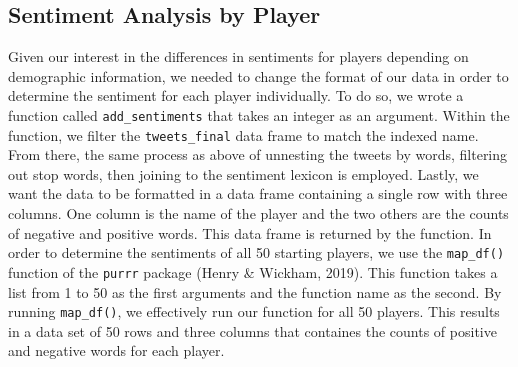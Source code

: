 \documentclass[12pt,twoside]{reedthesis}
\begin{document}
\subsection{Sentiment Analysis by
Player}\label{sentiment-analysis-by-player}

Given our interest in the differences in sentiments for players
depending on demographic information, we needed to change the format of
our data in order to determine the sentiment for each player
individually. To do so, we wrote a function called
\texttt{add\_sentiments} that takes an integer as an argument. Within
the function, we filter the \texttt{tweets\_final} data frame to match
the indexed name. From there, the same process as above of unnesting the
tweets by words, filtering out stop words, then joining to the sentiment
lexicon is employed. Lastly, we want the data to be formatted in a data
frame containing a single row with three columns. One column is the name
of the player and the two others are the counts of negative and positive
words. This data frame is returned by the function. In order to
determine the sentiments of all 50 starting players, we use the
\texttt{map\_df()} function of the \texttt{purrr} package (Henry \&
Wickham, 2019). This function takes a list from 1 to 50 as the first
arguments and the function name as the second. By running
\texttt{map\_df()}, we effectively run our function for all 50 players.
This results in a data set of 50 rows and three columns that containes
the counts of positive and negative words for each player.
\end{document}
